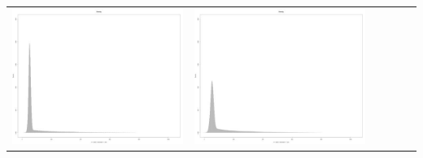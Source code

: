 \begin{table}[htbp]
{\begin{tabular}{l | ccccc}
\begin{minipage}{.1\textwidth}
     			 	\includegraphics[width=\linewidth]{images/mema-dens-graph/N3}
    				 \end{minipage}
    			   & \begin{minipage}{.1\textwidth}
     			 	\includegraphics[width=\linewidth]{images/mema-dens-graph/N7}
    				 \end{minipage}
    			   &	 \begin{minipage}{.1\textwidth}

\end{minipage}
\end{tabular}}
\end{table}
